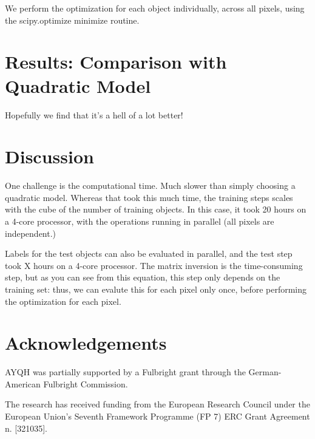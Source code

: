 \documentclass[12pt, preprint]{aastex}
\begin{document}
We perform the optimization for each object individually, across all pixels,
using the scipy.optimize minimize routine. 

\section{Results: Comparison with Quadratic Model}

Hopefully we find that it's a hell of a lot better!


\section{Discussion}

One challenge is the computational time. Much slower than simply choosing 
a quadratic model. Whereas that took this much time, the training steps scales 
with the cube of the number of training objects. In this case, it took 20 
hours on a 4-core processor, with the operations running in parallel (all 
pixels are independent.) 

Labels for the test objects can also be 
evaluated in parallel, and the test step took X hours on a 4-core processor. 
The matrix inversion is the time-consuming step, but as you can see from this
equation, this step only depends on the training set: thus, we can evalute
this for each pixel only once, before performing the optimization for each 
pixel. 

\section{Acknowledgements}

AYQH was partially supported by a Fulbright grant through the German-American
Fulbright Commission.

The research has received funding from the European Research Council under the
European Union's Seventh Framework Programme (FP 7) ERC Grant Agreement n.
[321035].


\end{document}
